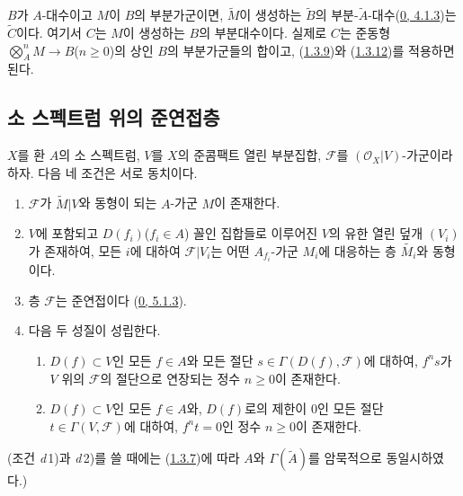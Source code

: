 \begin{env}[1.3.14]
\label{I.1.3.14-ko}
$B$가 $A$-대수이고 $M$이 $B$의 부분가군이면,
$\widetilde{M}$이 생성하는 $\widetilde{B}$의
부분-$\widetilde{A}$-대수(\hyperref[0.4.1.3-ko]{0, 4.1.3})는
$\widetilde{C}$이다. 여기서 $C$는 $M$이 생성하는 $B$의 부분대수이다.
실제로 $C$는 준동형 $\bigotimes_A^n M\to B$($n\geq0$)의 상인
$B$의 부분가군들의 합이고, (\hyperref[I.1.3.9-ko]{1.3.9})와
(\hyperref[I.1.3.12-ko]{1.3.12})를 적용하면 된다.
\end{env}

\subsection{소 스펙트럼 위의 준연접층}
\label{subsection:I.1.4-ko}

\begin{theorem}[1.4.1]
\label{I.1.4.1-ko}
$X$를 환 $A$의 소 스펙트럼, $V$를 $X$의 준콤팩트 열린 부분집합,
$\mathscr{F}$를 $(\mathscr{O}_X|V)$-가군이라 하자. 다음 네 조건은
서로 동치이다.
\begin{enumerate}
  \item[\textit{a})] $\mathscr{F}$가 $\widetilde{M}|V$와 동형이 되는
  $A$-가군 $M$이 존재한다.
  \item[\textit{b})] $V$에 포함되고 $D(f_i)$($f_i\in A$) 꼴인
  집합들로 이루어진 $V$의 유한 열린 덮개 $(V_i)$가 존재하여, 모든
  $i$에 대하여 $\mathscr{F}|V_i$는 어떤 $A_{f_i}$-가군 $M_i$에
  대응하는 층 $\widetilde{M_i}$와 동형이다.
  \item[\textit{c})] 층 $\mathscr{F}$는 준연접이다
  (\hyperref[0.5.1.3-ko]{0, 5.1.3}).
  \item[\textit{d})] 다음 두 성질이 성립한다.
  \begin{enumerate}
    \item[\textit{d}\,1)] $D(f)\subset V$인 모든 $f\in A$와 모든 절단
    $s\in\Gamma(D(f),\mathscr{F})$에 대하여, $f^n s$가 $V$ 위의
    $\mathscr{F}$의 절단으로 연장되는 정수 $n\geq0$이 존재한다.
    \item[\textit{d}\,2)] $D(f)\subset V$인 모든 $f\in A$와,
    $D(f)$로의 제한이 $0$인 모든 절단
    $t\in\Gamma(V,\mathscr{F})$에 대하여, $f^n t=0$인 정수
    $n\geq0$이 존재한다.
  \end{enumerate}
\end{enumerate}
\end{theorem}

(조건 \textit{d}\,1)과 \textit{d}\,2)를 쓸 때에는
(\hyperref[I.1.3.7-ko]{1.3.7})에 따라 $A$와
$\Gamma(\widetilde{A})$를 암묵적으로 동일시하였다.)

